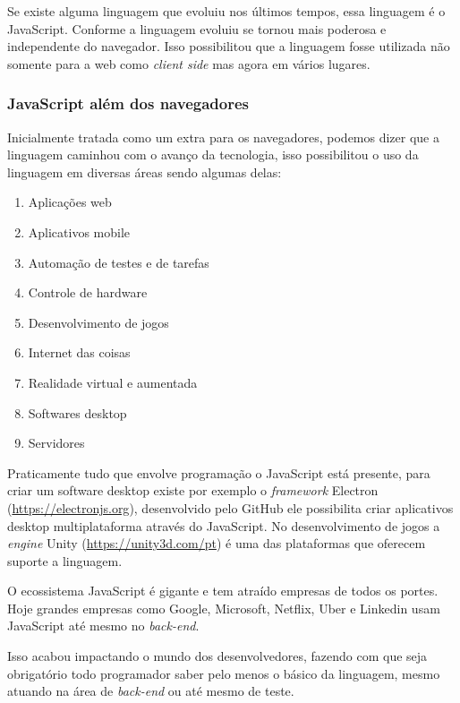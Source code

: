 \documentclass[
	12pt,				%
	openright,			%
	twoside,			%
	a4paper,			%
	english,			%
	brazil				%
	]{abntex2}
\begin{document}
Se existe alguma linguagem que evoluiu nos últimos tempos, essa linguagem é o JavaScript. Conforme a linguagem evoluiu se tornou mais poderosa e independente do navegador. Isso possibilitou que a linguagem fosse utilizada não somente para a web como \textit{client side} mas agora em vários lugares. 

\subsubsection{JavaScript além dos navegadores}
\label{subsec:JavaScriptAlemNavegadores}

Inicialmente tratada como um extra para os navegadores, podemos dizer que a linguagem caminhou com o avanço da tecnologia, isso possibilitou o uso da linguagem em diversas áreas sendo algumas delas:

\begin{enumerate}[label=\alph*)]
\item Aplicações web
\item Aplicativos mobile 
\item Automação de testes e de tarefas
\item Controle de hardware
\item Desenvolvimento de jogos
\item Internet das coisas
\item Realidade virtual e aumentada
\item Softwares desktop
\item Servidores 
\end{enumerate}

Praticamente tudo que envolve programação o JavaScript está presente, para criar um software desktop existe por exemplo o \textit{framework} Electron (\href{https://electronjs.org}{https://electronjs.org}), desenvolvido pelo GitHub ele possibilita criar aplicativos desktop multiplataforma através do JavaScript. No desenvolvimento de jogos a \textit{engine} Unity (\href{https://unity3d.com/pt}{https://unity3d.com/pt}) é uma das plataformas que oferecem suporte a linguagem.

O ecossistema JavaScript é gigante e tem atraído empresas de todos os portes. Hoje grandes empresas como Google, Microsoft, Netflix, Uber e Linkedin usam JavaScript até mesmo no \textit{back-end}. 

Isso acabou impactando o mundo dos desenvolvedores, fazendo com que seja obrigatório todo programador saber pelo menos o básico da linguagem, mesmo atuando na área de \textit{back-end} ou até mesmo de teste.
\end{document}
